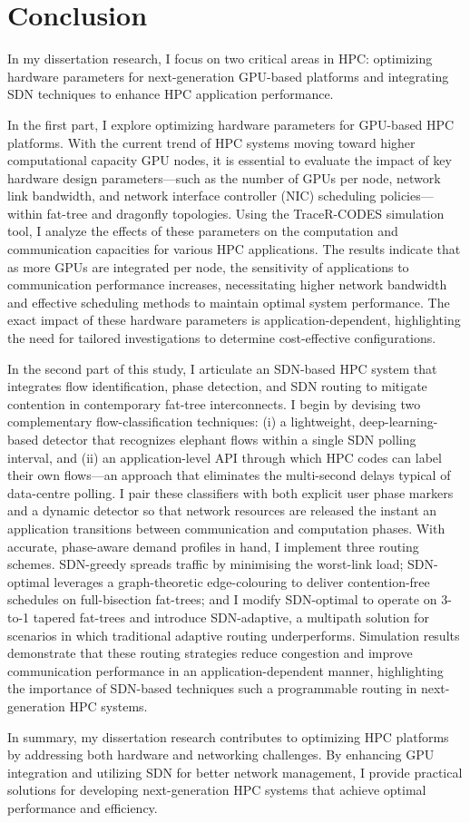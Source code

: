 \chapter{Conclusion}
In my dissertation research, I focus on two critical areas in HPC: optimizing hardware parameters for next-generation GPU-based platforms and integrating SDN techniques to enhance HPC application performance.

In the first part, I explore optimizing hardware parameters for GPU-based HPC platforms. With the current trend of HPC systems moving toward higher computational capacity GPU nodes, it is essential to evaluate the impact of key hardware design parameters—such as the number of GPUs per node, network link bandwidth, and network interface controller (NIC) scheduling policies—within fat-tree and dragonfly topologies. Using the TraceR-CODES simulation tool, I analyze the effects of these parameters on the computation and communication capacities for various HPC applications. The results indicate that as more GPUs are integrated per node, the sensitivity of applications to communication performance increases, necessitating higher network bandwidth and effective scheduling methods to maintain optimal system performance. The exact impact of these hardware parameters is application-dependent, highlighting the need for tailored investigations to determine cost-effective configurations.

In the second part of this study, I articulate an SDN-based HPC system that integrates flow identification, phase detection, and SDN routing to mitigate contention in contemporary fat-tree interconnects. I begin by devising two complementary flow-classification techniques: (i) a lightweight, deep-learning-based detector that recognizes elephant flows within a single SDN polling interval, and (ii) an application-level API through which HPC codes can label their own flows—an approach that eliminates the multi-second delays typical of data-centre polling. I pair these classifiers with both explicit user phase markers and a dynamic detector so that network resources are released the instant an application transitions between communication and computation phases. With accurate, phase-aware demand profiles in hand, I implement three routing schemes. SDN-greedy spreads traffic by minimising the worst-link load; SDN-optimal leverages a graph-theoretic edge-colouring to deliver contention-free schedules on full-bisection fat-trees; and I modify SDN-optimal to operate on 3-to-1 tapered fat-trees and introduce SDN-adaptive, a multipath solution for scenarios in which traditional adaptive routing underperforms. Simulation results demonstrate that these routing strategies reduce congestion and improve communication performance in an application-dependent manner, highlighting the importance of SDN-based techniques such a  programmable routing in next-generation HPC systems.

In summary, my dissertation research contributes to optimizing HPC platforms by addressing both hardware and networking challenges. By enhancing GPU integration and utilizing SDN for better network management, I provide practical solutions for developing next-generation HPC systems that achieve optimal performance and efficiency.
